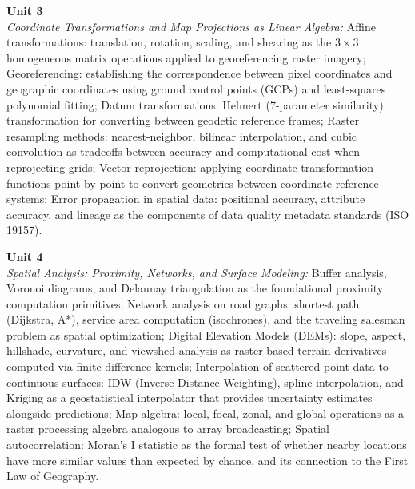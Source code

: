\vspace{0.3cm}

\noindent\textbf{Unit 3} \\
\textit{Coordinate Transformations and Map Projections as Linear Algebra:} Affine transformations: translation, rotation, scaling, and shearing as the $3 \times 3$ homogeneous matrix operations applied to georeferencing raster imagery; Georeferencing: establishing the correspondence between pixel coordinates and geographic coordinates using ground control points (GCPs) and least-squares polynomial fitting; Datum transformations: Helmert (7-parameter similarity) transformation for converting between geodetic reference frames; Raster resampling methods: nearest-neighbor, bilinear interpolation, and cubic convolution as tradeoffs between accuracy and computational cost when reprojecting grids; Vector reprojection: applying coordinate transformation functions point-by-point to convert geometries between coordinate reference systems; Error propagation in spatial data: positional accuracy, attribute accuracy, and lineage as the components of data quality metadata standards (ISO 19157).

\vspace{0.3cm}

\noindent\textbf{Unit 4} \\
\textit{Spatial Analysis: Proximity, Networks, and Surface Modeling:} Buffer analysis, Voronoi diagrams, and Delaunay triangulation as the foundational proximity computation primitives; Network analysis on road graphs: shortest path (Dijkstra, A*), service area computation (isochrones), and the traveling salesman problem as spatial optimization; Digital Elevation Models (DEMs): slope, aspect, hillshade, curvature, and viewshed analysis as raster-based terrain derivatives computed via finite-difference kernels; Interpolation of scattered point data to continuous surfaces: IDW (Inverse Distance Weighting), spline interpolation, and Kriging as a geostatistical interpolator that provides uncertainty estimates alongside predictions; Map algebra: local, focal, zonal, and global operations as a raster processing algebra analogous to array broadcasting; Spatial autocorrelation: Moran's I statistic as the formal test of whether nearby locations have more similar values than expected by chance, and its connection to the First Law of Geography.

\vspace{0.3cm}

